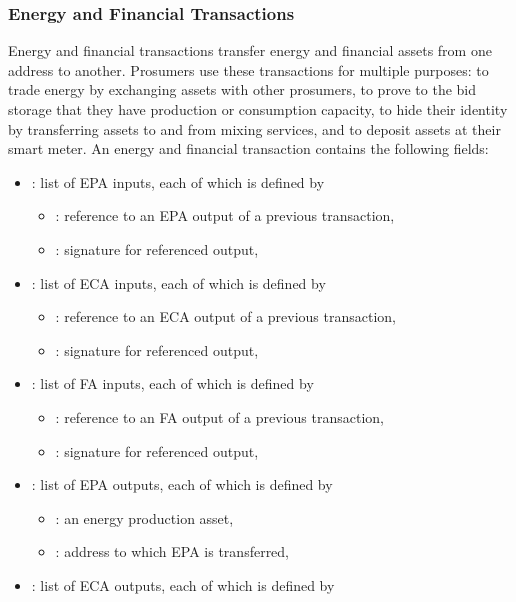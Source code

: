 \subsubsection{Energy and Financial Transactions}

Energy and financial transactions transfer energy and financial assets from one address to another.
Prosumers use these transactions for multiple purposes: to trade energy by exchanging assets with other prosumers, to prove to the bid storage that they have production or consumption capacity, to hide their identity by transferring assets to and from mixing services, and to deposit assets at their smart meter.
%
An energy and financial transaction contains the following fields:
\begin{itemize}[noitemsep,topsep=-\parskip]
\item {}: list of EPA inputs, each of which is defined by
\begin{itemize}[leftmargin=0.5em,nosep]
\item {}: reference to an EPA output of a previous transaction,
\item {}: signature for referenced output,
\end{itemize}
\item {}: list of ECA inputs, each of which is defined by
\begin{itemize}[leftmargin=0.5em,nosep]
\item {}: reference to an ECA output of a previous transaction,
\item {}: signature for referenced output,
\end{itemize}
\item {}: list of FA inputs, each of which is defined by
\begin{itemize}[leftmargin=0.5em,nosep]
\item {}: reference to an FA output of a previous transaction,
\item {}: signature for referenced output,
\end{itemize}
\item {}: list of EPA outputs, each of which is defined by
\begin{itemize}[leftmargin=0.5em,nosep]
\item {}: an energy production asset,
\item {}: address to which EPA is transferred,
\end{itemize}
\item {}: list of ECA outputs, each of which is defined by

\end{itemize}
